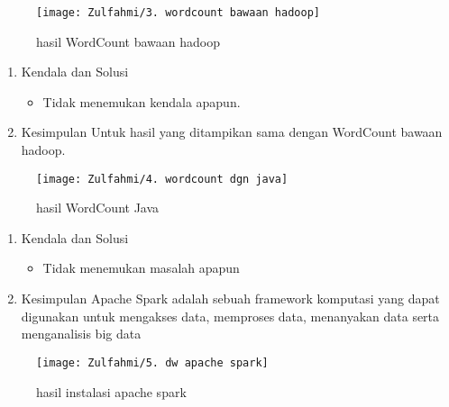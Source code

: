 \begin{figure}[!ht]
    \texttt{[image: Zulfahmi/3. wordcount bawaan hadoop]}
    \caption{hasil WordCount bawaan hadoop}
    \label{gam:Hasil}
\end{figure}

\clearpage
{}
\begin{enumerate}
\item Kendala dan Solusi

\begin{itemize}
\item Tidak menemukan kendala apapun.
\end{itemize}

\item Kesimpulan
\newline
    Untuk hasil yang ditampikan sama dengan WordCount bawaan hadoop.

\end{enumerate}

\begin{figure}[!ht]
    \texttt{[image: Zulfahmi/4. wordcount dgn java]}
    \caption{hasil WordCount Java}
    \label{gam:Hasil}
\end{figure}


\clearpage
{}
\begin{enumerate}
\item Kendala dan Solusi

\begin{itemize}
\item Tidak menemukan masalah apapun
\end{itemize}


\item Kesimpulan
\newline
    Apache Spark adalah sebuah framework komputasi
    yang dapat digunakan untuk mengakses data, memproses
    data, menanyakan data serta menganalisis big data

\end{enumerate}

\begin{figure}[!ht]
\texttt{[image: Zulfahmi/5. dw apache spark]}
\caption{hasil instalasi apache spark }
\label{gam:hasil instalasi spark}
\end{figure}

